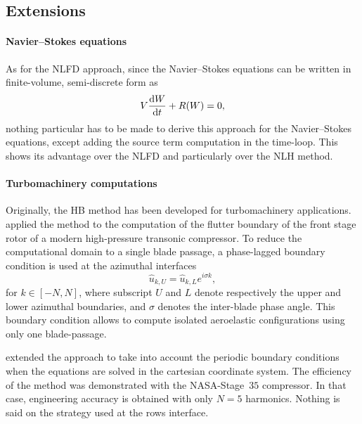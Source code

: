 
\subsection{Extensions}
\label{sec:sm_hb_extension}

\paragraph{Navier--Stokes equations}
As for the NLFD approach, since the 
Navier--Stokes equations can be written in finite-volume,
semi-discrete form as
\begin{equation}
	V \frac{\mathop{}\!\mathrm{d} W}{\mathop{}\!\mathrm{d} t} + R(W) = 0,
\end{equation}
nothing particular has to be made to derive this approach for
the Navier--Stokes equations, except adding the source term computation
in the time-loop.
This shows its advantage over the NLFD and particularly over the NLH method.

\paragraph{Turbomachinery computations}
Originally, the HB method has been developed for 
turbomachinery applications.
\citet{Hall2002} applied the method to the computation
of the flutter boundary of the front stage rotor 
of a modern high-pressure transonic compressor. To reduce the
computational domain to a single blade passage, 
a phase-lagged boundary condition is used at the azimuthal
interfaces
\begin{equation}
	\widehat{u}_{k, U} = \widehat{u}_{k, L} e^{i \sigma k},
\end{equation}
for $k \in [-N, N]$, where subscript $U$ and $L$ denote
respectively the upper and lower azimuthal boundaries, and
$\sigma$ denotes the inter-blade phase angle. This boundary
condition allows to compute isolated aeroelastic configurations
using only one blade-passage.

 extended the approach to take into account
the periodic boundary conditions when the equations are solved in the
cartesian coordinate system. The efficiency of the
method was demonstrated with the NASA-Stage~$35$ compressor. In that case,
engineering accuracy is obtained with only $N=5$ harmonics.
Nothing is said on the strategy used at the rows interface.

